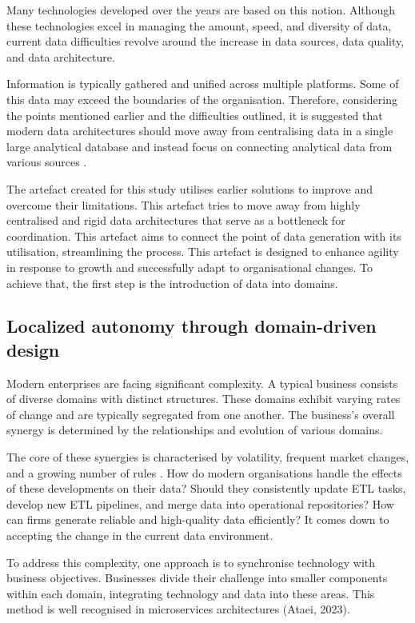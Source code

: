 \documentclass{ieeeaccess}
\begin{document}
Many technologies developed over the years are based on this notion. Although these technologies excel in managing the amount, speed, and diversity of data, current data difficulties revolve around the increase in data sources, data quality, and data architecture. 

Information is typically gathered and unified across multiple platforms. Some of this data may exceed the boundaries of the organisation. Therefore, considering the points mentioned earlier and the difficulties outlined, it is suggested that modern data architectures should move away from centralising data in a single large analytical database and instead focus on connecting analytical data from various sources \cite{ataei2022state,DataMesh}. 

The artefact created for this study utilises earlier solutions to improve and overcome their limitations. This artefact tries to move away from highly centralised and rigid data architectures that serve as a bottleneck for coordination. This artefact aims to connect the point of data generation with its utilisation, streamlining the process. This artefact is designed to enhance agility in response to growth and successfully adapt to organisational changes. To achieve that, the first step is the introduction of data into domains. 

\subsection{Localized autonomy through domain-driven design}

Modern enterprises are facing significant complexity. A typical business consists of diverse domains with distinct structures. These domains exhibit varying rates of change and are typically segregated from one another. The business's overall synergy is determined by the relationships and evolution of various domains. 

The core of these synergies is characterised by volatility, frequent market changes, and a growing number of rules \cite{popovivc2018impact}. How do modern organisations handle the effects of these developments on their data? Should they consistently update ETL tasks, develop new ETL pipelines, and merge data into operational repositories? How can firms generate reliable and high-quality data efficiently? It comes down to accepting the change in the current data environment. 

To address this complexity, one approach is to synchronise technology with business objectives. Businesses divide their challenge into smaller components within each domain, integrating technology and data into these areas. This method is well recognised in microservices architectures (Ataei, 2023). 
\end{document}
